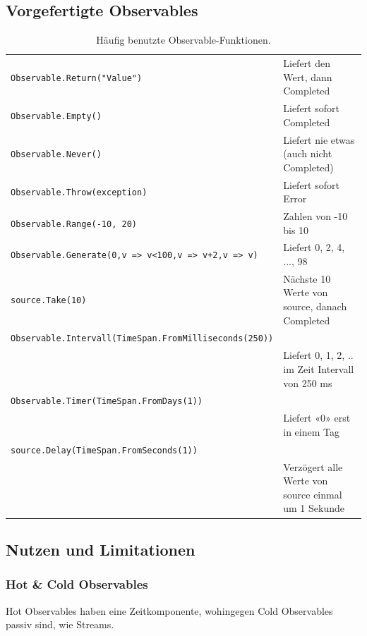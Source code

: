 \subsection{Vorgefertigte Observables}

\begin{table}
	\lstset{linewidth=4.5cm}
	\begin{tabu}{X l}
		\lstinline|Observable.Return("Value")| & Liefert den Wert, dann Completed \\
		\lstinline|Observable.Empty()| & Liefert sofort Completed \\
		\lstinline|Observable.Never()| & Liefert nie etwas (auch nicht Completed) \\
		\lstinline|Observable.Throw(exception)| & Liefert sofort Error \\
		\lstinline|Observable.Range(-10, 20)| & Zahlen von -10 bis 10 \\
		\lstinline|Observable.Generate(0,v => v<100,v => v+2,v => v)| & Liefert 0, 2, 4, ..., 98 \\
		\lstinline|source.Take(10)| & Nächste 10 Werte von source, danach Completed \\
		\lstinline|Observable.Intervall(TimeSpan.FromMilliseconds(250))| & \\
		&  Liefert 0, 1, 2, .. im Zeit Intervall von 250 ms \\

		\lstinline|Observable.Timer(TimeSpan.FromDays(1))| & \\
		& Liefert «0» erst in einem Tag \\

		\lstinline|source.Delay(TimeSpan.FromSeconds(1))| & \\
		& Verzögert alle Werte von source einmal um 1 Sekunde
	\end{tabu}
\caption{Häufig benutzte Observable-Funktionen.}
\end{table}



\subsection{Nutzen und Limitationen}

\subsubsection{Hot \& Cold Observables}

Hot Observables haben eine Zeitkomponente, wohingegen Cold Observables passiv sind, wie Streams.


